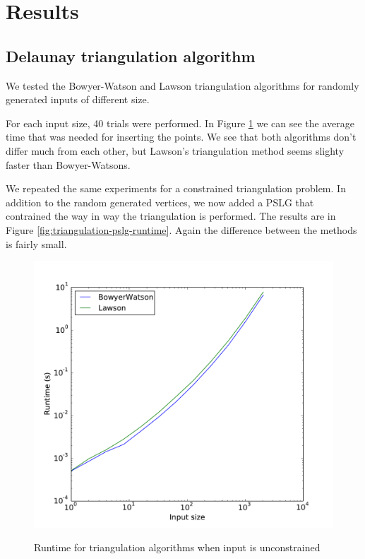 \section{Results}
\label{sec:results}

\subsection{Delaunay triangulation algorithm}
\label{sub:results:triangulation}

We tested the Bowyer-Watson and Lawson triangulation algorithms for randomly generated inputs of different size.

For each input size, 40 trials were performed.
In Figure \ref{fig:triangulation-runtime} we can see the average time that was needed for inserting the points.
We see that both algorithms don't differ much from each other, but Lawson's triangulation method seems slighty faster than Bowyer-Watsons.


We repeated the same experiments for a constrained triangulation problem.
In addition to the random generated vertices, we now added a PSLG that contrained the way in way the triangulation is performed.
The results are in Figure \ref{fig:triangulation-pslg-runtime}.
Again the difference between the methods is fairly small.

\begin{figure}[ht]
    \centering
    \includegraphics[width=\columnwidth]{../images/runtime.pdf}
    \label{fig:triangulation-runtime}
    \caption{Runtime for triangulation algorithms when input is unconstrained}
\end{figure}

